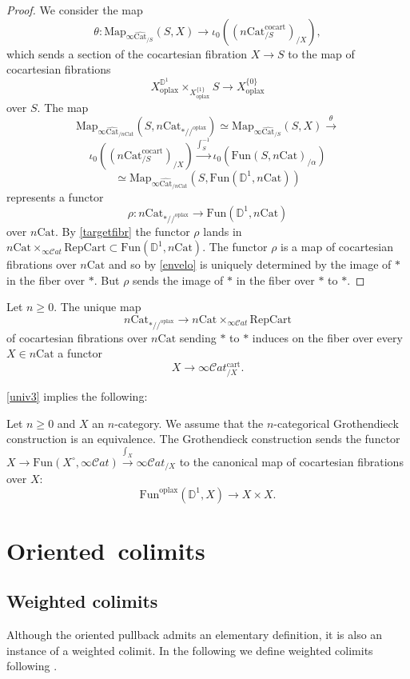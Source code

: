 \documentclass[10pt,oneside]{article}
\numberwithin{equation}{section} %
\numberwithin{figure}{section} %
\theoremstyle{plain}
\theoremstyle{definition}
\newcommand{\bD}{{\mathbb D}}
\newcommand{\Cat}{\mathrm{Cat}}
\newcommand{\Rep}{\mathrm{Rep}}
\newcommand{\Fun}{\mathrm{Fun}}
\newcommand{\cocart}{{\mathrm{cocart}}}
\newcommand{\cart}{{\mathrm{cart}}}
\newcommand{\Cart}{{\mathrm{Cart}}}
\newcommand{\oplax}{{\mathrm{oplax}}}
\newcommand{\Map}{{\mathrm{Map}}}
\newcommand{\scat}{\mathcal{C}\mathit{at}}
\begin{document}
\begin{proof}

We consider the map $$ \theta: \Map_{\infty\widehat{\Cat}_{/S}}(S,X) \to \iota_0((n\Cat^{\cocart}_{/S})_{/X}), $$ which sends a section of the cocartesian fibration $X \to S $ to the map of cocartesian fibrations
$$ X^{\bD^1}_\oplax \times_{X_\oplax^{\{1\}}} S \to X_\oplax^{\{0\}}$$
over $S$.
The map $$\Map_{\infty\widehat{\Cat}_{/n\Cat}}(S,n\Cat_{*//^\oplax}) \simeq \Map_{\infty\widehat{\Cat}_{/S}}(S,X) \xrightarrow{\theta} $$$$\iota_0((n\Cat^{\cocart}_{/S})_{/X}) \xrightarrow{\int_S^{-1}}\iota_0(\Fun(S,n\Cat)_{/\alpha})$$$$ \simeq \Map_{\infty\widehat{\Cat}_{/n\Cat}}(S,\Fun(\bD^1, n\Cat)) $$
represents a functor $$ \rho: n\Cat_{*//^\oplax} \to \Fun(\bD^1, n\Cat) $$
over $ n\Cat$. By \cref{targetfibr} the functor $\rho$ lands in $ n \Cat \times_{\infty\scat} \Rep\Cart \subset \Fun(\bD^1, n\Cat)$. The functor $\rho $ is a map of cocartesian fibrations over $ n\Cat$
and so by \cref{envelo} is uniquely determined by the image of $*$ in the fiber over $*.$ But $\rho$ sends the image of $*$ in the fiber over $*$ to $*.$
\end{proof}

Let $n \geq 0$. The unique map $$ n\Cat_{*//^\oplax} \to n \Cat \times_{\infty\scat} \Rep\Cart $$
of cocartesian fibrations over $ n\Cat$ sending $* $ to $*$
induces on the fiber over every $X \in n\Cat$ a functor $$X \to \infty\scat^\cart_{/X}.$$

\cref{univ3} implies the following:

\begin{corollary}\label{univ4} Let $n \geq 0$ and $X $ an $n$-category. We assume that the $n$-categorical Grothendieck construction is an equivalence.
The Grothendieck construction sends the functor 
$X \to \Fun(X^\circ, \infty\scat) \xrightarrow{\int_X} \infty\scat_{/X}$
to the canonical map of cocartesian fibrations
over $X:$
$$ \Fun^\oplax(\bD^1,X) \to X \times X. $$

\end{corollary}

\section{\mbox{Oriented colimits}}

\subsection{Weighted colimits}
Although the oriented pullback admits an elementary definition, it is also an instance of a weighted colimit.
In the following we define weighted colimits following \cite{heine2024higher}.
\end{document}
